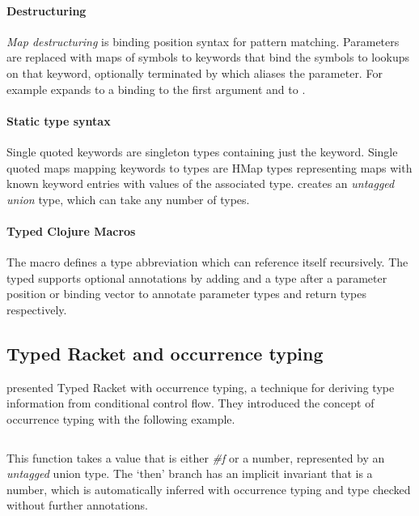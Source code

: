 \paragraph{Destructuring} \emph{Map destructuring} is binding position syntax for pattern matching.
Parameters are replaced with maps of symbols to keywords that bind the symbols
to lookups on that keyword, optionally terminated by 
which aliases the parameter. For example
expands to a  binding  to the first argument and 
 to .

\paragraph{Static type syntax} Single quoted keywords are singleton types containing just the keyword.
Single quoted maps mapping keywords to types 
are HMap types representing
maps with known keyword entries with values of the associated type.
 creates an \emph{untagged union} type, which can take
any number of types.

\paragraph{Typed Clojure Macros}
The  macro defines a type abbreviation which can reference itself recursively.
The typed  supports optional annotations by 
adding
\clj{:-} and a type after a parameter
position
or binding vector 
to annotate parameter types
and return types respectively.

\subsection{Typed Racket and occurrence typing}

\citet{TF10}
presented Typed Racket with occurrence typing,
a technique for deriving type information from conditional control flow.
They introduced the concept of occurrence typing 
with the following example.

\inputminted[firstline=1]{racket}{code/tr/example1.rkt}

This function takes a value that is either \emph{\#f} %
or a number, represented by an \emph{untagged} union type.
The `then' branch has an implicit invariant
that  is a number, which is automatically inferred with occurrence typing
and type checked without further annotations.

